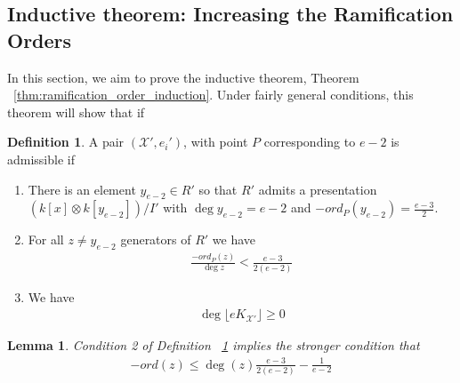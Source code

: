 \documentclass{amsart}
\theoremstyle{plain}
\newtheorem{lem}[thm]{Lemma}
\theoremstyle{definition}
\newtheorem{defn}[thm]{Definition}
\theoremstyle{remark}
\numberwithin{equation}{section}
\newcommand\ssec{\subsection}
\newcommand \sx{\mathscr X}
\begin{document}


\ssec{Inductive theorem: Increasing the Ramification Orders}
\label{ssec:g_0_ram_orders}
In this section, we aim to prove the inductive theorem, Theorem
~\ref{thm:ramification_order_induction}. Under fairly general
conditions, this theorem will show that if

\begin{defn}
\label{defn:admissible}
A pair $(\sx',e_i')$, with point $P$ corresponding to $e-2$ is
admissible if
\begin{enumerate}
	\item There is an element $y_{e-2} \in R'$ so that $R'$ admits a
			presentation $(k[x] \otimes k[y_{e-2}])/I'$ with $\deg y_{e-2} = e-2$
			and $-ord_P(y_{e-2}) = \frac{e-3}{2}$.
\item For all $z \neq y_{e-2}$ generators of $R'$ we have
\begin{align*}
	\frac{- ord_P(z)}{\deg z} < \frac{e-3}{2(e-2)}
\end{align*}
\item We have
\begin{align*}
	\deg \lfloor e K_{\sx'} \rfloor \geq 0
\end{align*}
\end{enumerate}
\end{defn}

\begin{lem}
\label{lem:admissible_inequality}
Condition 2 of Definition ~\ref{defn:admissible} implies the
stronger condition that
\begin{align*}
	-ord(z) \leq \deg(z) \frac{e-3}{2(e-2)}-\frac{1}{e-2}
\end{align*}
\end{lem}
\end{document}
